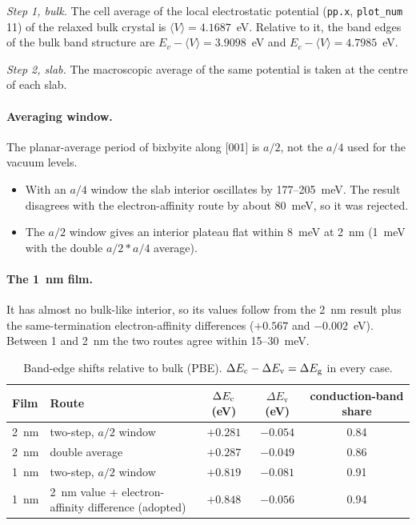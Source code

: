 \emph{Step 1, bulk.} The cell average of the local electrostatic potential (\texttt{pp.x}, \texttt{plot\_num} 11) of
the relaxed bulk crystal is $\langle V\rangle = 4.1687$~eV. Relative to it, the band edges of the bulk band structure
are $E_v - \langle V\rangle = 3.9098$~eV and $E_c - \langle V\rangle = 4.7985$~eV.

\emph{Step 2, slab.} The macroscopic average of the same potential is taken at the centre of each slab.

\paragraph{Averaging window.} The planar-average period of bixbyite along [001] is $a/2$, not the $a/4$ used for the
vacuum levels.
\begin{itemize}
\item With an $a/4$ window the slab interior oscillates by 177--205~meV. The result disagrees with the
electron-affinity route by about 80~meV, so it was rejected.
\item The $a/2$ window gives an interior plateau flat within 8~meV at 2~nm (1~meV with the double $a/2\ast a/4$
average).
\end{itemize}

\paragraph{The 1~nm film.} It has almost no bulk-like interior, so its values follow from the 2~nm result plus the
same-termination electron-affinity differences ($+0.567$ and $-0.002$~eV). Between 1 and 2~nm the two routes agree
within 15--30~meV.

\begin{table}[htbp]\centering\small
\caption{Band-edge shifts relative to bulk (PBE). $\Delta E_{\mathrm{c}} - \Delta E_{\mathrm{v}} = \Delta E_{\mathrm{g}}$ in every case.}
\label{tab:dft-partition}
\begin{tabular}{llccc}\toprule
Film & Route & $\Delta E_{\mathrm{c}}$ (eV) & $\Delta E_{\mathrm{v}}$ (eV) & conduction-band share\\\midrule
2~nm & two-step, $a/2$ window & $+0.281$ & $-0.054$ & 0.84\\
2~nm & double average & $+0.287$ & $-0.049$ & 0.86\\
1~nm & two-step, $a/2$ window & $+0.819$ & $-0.081$ & 0.91\\
1~nm & 2~nm value + electron-affinity difference (adopted) & $+0.848$ & $-0.056$ & 0.94\\\bottomrule
\end{tabular}
\end{table}

